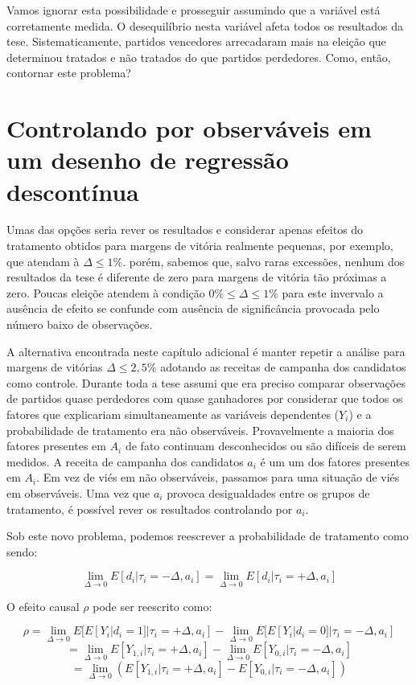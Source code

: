 Vamos ignorar esta possibilidade e prosseguir assumindo que a variável está corretamente medida. O desequilíbrio nesta variável afeta todos os resultados da tese. Sistematicamente, partidos vencedores arrecadaram mais na eleição que determinou tratados e não tratados do que partidos perdedores. Como, então, contornar este problema?

\section{Controlando por observáveis em um desenho de regressão descontínua}

Umas das opções seria rever os resultados e considerar apenas efeitos do tratamento obtidos para margens de vitória realmente pequenas, por exemplo, que atendam à $\Delta \leq 1\%$. porém, sabemos que, salvo raras excessões, nenhum dos resultados da tese é diferente de zero para margens de vitória tão próximas a zero. Poucas eleiçõe atendem à condição $0\% \leq \Delta \leq 1\%$ para este invervalo a ausência de efeito se confunde com ausência de significância provocada pelo número baixo de observações.

A alternativa encontrada neste capítulo adicional é manter repetir a análise para margens de vitórias $\Delta \leq 2,5\%$ adotando as receitas de campanha dos candidatos como controle. Durante toda a tese assumi que era preciso comparar observações de partidos quase perdedores com quase ganhadores por considerar que todos os fatores que explicariam simultaneamente as variáveis dependentes ($Y_{i}$) e a probabilidade de tratamento era não observáveis. Provavelmente a maioria dos fatores presentes em $A_{i}$ de fato continuam desconhecidos ou são difíceis de serem medidos. A receita de campanha dos candidatos $a_{i}$ é um um dos fatores presentes em $A_{i}$. Em vez de viés em não observáveis, passamos para uma situação de viés em observáveis. Uma vez que $a_{i}$ provoca desigualdades entre os grupos de tratamento, é possível rever os resultados controlando por $a_{i}$.

Sob este novo problema, podemos reescrever a probabilidade de tratamento como sendo: 

\[
\lim_{\Delta \to 0} E[d_{i}|\tau_{i}=-\Delta,a_{i}]=\lim_{\Delta \to 0} E[d_{i}|\tau_{i}=+\Delta,a_{i}]
\]

O efeito causal $\rho$ pode ser reescrito como: 

\[\rho =\lim_{\Delta \to 0} E[E[Y_{i}|d_{i}=1]|\tau_{i}=+\Delta,a_{i}] - \lim_{\Delta \to 0} E[E[Y_{i}|d_{i}=0]|\tau_{i}=-\Delta,a_{i}]\]
\[=\lim_{\Delta \to 0} E[Y_{1,i}|\tau_{i}=+\Delta,a_{i}] - \lim_{\Delta \to 0} E[Y_{0,i}|\tau_{i}=-\Delta,a_{i}]\]
\[=\lim_{\Delta \to 0} (E[Y_{1,i}|\tau_{i}=+\Delta,a_{i}] - E[Y_{0,i}|\tau_{i}=-\Delta,a_{i}])\] 


